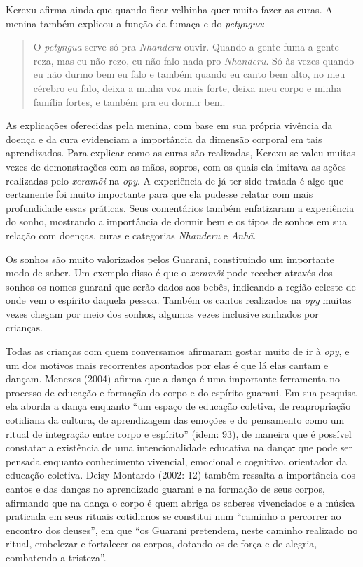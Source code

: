Kerexu afirma ainda que quando ficar velhinha quer muito fazer as curas.
A menina também explicou a função da fumaça e do \emph{petyngua}:

\begin{quote}
O \emph{petyngua} serve só pra \emph{Nhanderu} ouvir. Quando a gente
fuma a gente reza, mas eu não rezo, eu não falo nada pro
\emph{Nhanderu}. Só às vezes quando eu não durmo bem eu falo e também
quando eu canto bem alto, no meu cérebro eu falo, deixa a minha voz mais
forte, deixa meu corpo e minha família fortes, e também pra eu dormir
bem.
\end{quote}

As explicações oferecidas pela menina, com base em sua própria vivência
da doença e da cura evidenciam a importância da dimensão corporal em
tais aprendizados. Para explicar como as curas são realizadas, Kerexu se
valeu muitas vezes de demonstrações com as mãos, sopros, com os quais
ela imitava as ações realizadas pelo \emph{xeramõi} na \emph{opy}. A
experiência de já ter sido tratada é algo que certamente foi muito
importante para que ela pudesse relatar com mais profundidade essas
práticas. Seus comentários também enfatizaram a experiência do sonho,
mostrando a importância de dormir bem e os tipos de sonhos em sua
relação com doenças, curas e categorias \emph{Nhanderu} e \emph{Anhã}.

Os sonhos são muito valorizados pelos Guarani, constituindo um
importante modo de saber. Um exemplo disso é que o \emph{xeramõi} pode
receber através dos sonhos os nomes guarani que serão dados aos bebês,
indicando a região celeste de onde vem o espírito daquela pessoa. Também
os cantos realizados na \emph{opy} muitas vezes chegam por meio dos
sonhos, algumas vezes inclusive sonhados por crianças.

Todas as crianças com quem conversamos afirmaram gostar muito de ir à
\emph{opy}, e um dos motivos mais recorrentes apontados por elas é que
lá elas cantam e dançam. Menezes (2004) afirma que a dança é uma
importante ferramenta no processo de educação e formação do corpo e do
espírito guarani. Em sua pesquisa ela aborda a dança enquanto ``um
espaço de educação coletiva, de reapropriação cotidiana da cultura, de
aprendizagem das emoções e do pensamento como um ritual de integração
entre corpo e espírito'' (idem: 93), de maneira que é possível constatar
a existência de uma intencionalidade educativa na dança\sout{,} que pode
ser pensada enquanto conhecimento vivencial, emocional e cognitivo,
orientador da educação coletiva. Deisy Montardo (2002: 12) também
ressalta a importância dos cantos e das danças no aprendizado guarani e
na formação de seus corpos, afirmando que na dança o corpo é quem abriga
os saberes vivenciados e a música praticada em seus rituais cotidianos
se constitui num ``caminho a percorrer ao encontro dos deuses'', em que
``os Guarani pretendem, neste caminho realizado no ritual, embelezar e
fortalecer os corpos, dotando-os de força e de alegria, combatendo a
tristeza''.

